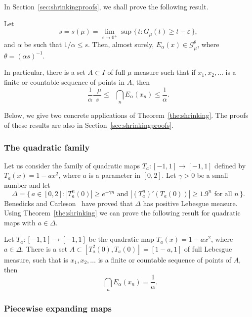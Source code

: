 \documentclass[AHL,Unicode,longabstracts]{cedram}
\DeclareMathOperator{\dimh}{dim_H}
\DeclareMathOperator{\udimh}{\overline{dim}_H}
\newcommand*{\dimh}{\mathrm{dim}_{\mathrm{H}}}
\begin{document}
In Section~\ref{sec:shrinkingproofs}, we shall prove the following result.

\begin{theo}\label{the:shrinking}
Let
\[
s = s (\mu) = \lim_{\varepsilon \to 0^+} \sup \{\, t : G_\mu (t)
\geq t - \varepsilon \,\},
\]
and $\alpha$ be such that $1/\alpha \leq s$. Then, almost surely, $E_\alpha (x) \in \mathscr{G}_\mu^\theta$, where $\theta = (\alpha s)^{-1}$.

In particular, there is a set $A \subset I$ of full $\mu$ measure such that if $x_1, x_2, \ldots$ is a finite or countable sequence of points in $A$, then
\[
\frac{1}{\alpha} \frac{\udimh \mu}{s} \leq \dimh \bigcap_n E_\alpha (x_n) \leq \frac{1}{\alpha}.
\]
\end{theo}

Below, we give two concrete applications of Theorem~\ref{the:shrinking}. The proofs of these results are also in Section~\ref{sec:shrinkingproofs}.

\subsubsection{The quadratic family} \label{sec:quadratic}

Let us consider the family of quadratic maps $T_a \colon [-1,1] \to [-1,1]$ defined by $T_a (x) = 1 - a x^2$, where $a$ is a parameter in $[0,2]$. Let $\gamma > 0$ be a small number and let
\[
\Delta = \{\, a \in [0, 2] : |T_a^n (0)| \geq e^{-\gamma n} \text{ and } |(T_a^n)' (T_a(0)) | \geq 1.9^n \text{ for all } n \,\}.
\]
Benedicks and Carleson~\cite{benedickscarleson} have proved that $\Delta$ has positive Lebesgue measure. Using Theorem~\ref{the:shrinking} we can prove the following result for quadratic maps with $a \in \Delta$.

\begin{coro}\label{cor:quadratic}
Let $T_a \colon [-1,1] \to [-1,1]$ be the quadratic map $T_a (x) = 1 - a x^2$, where $a \in \Delta$. There is a set $A \subset [T_a^2 (0), T_a (0)] = [1-a,1]$ of full Lebesgue measure, such that is $x_1, x_2, \ldots$ is a finite or countable sequence of points of\/ $A$, then
\[
\dimh \bigcap_n E_\alpha (x_n) = \frac{1}{\alpha}.
\]
\end{coro}


\subsubsection{Piecewise expanding maps} \label{sec:piecewise}
\end{document}
